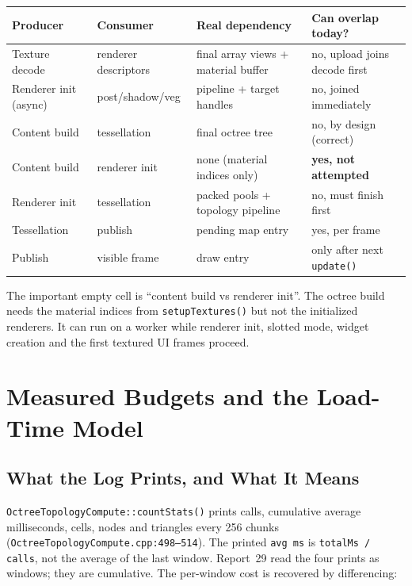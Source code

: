 \documentclass[11pt,a4paper]{article}
\begin{document}
\begin{table}[h]
\centering
\footnotesize
\begin{tabular}{@{}L{3.0cm}L{3.3cm}L{4.0cm}L{4.1cm}@{}}
\toprule
\textbf{Producer} & \textbf{Consumer} & \textbf{Real dependency} & \textbf{Can overlap today?} \\
\midrule
Texture decode & renderer descriptors & final array views + material buffer & no, upload joins decode first \\
Renderer init (async) & post/shadow/veg & pipeline + target handles & no, joined immediately \\
Content build & tessellation & final octree tree & no, by design (correct) \\
Content build & renderer init & none (material indices only) & \textbf{yes, not attempted} \\
Renderer init & tessellation & packed pools + topology pipeline & no, must finish first \\
Tessellation & publish & pending map entry & yes, per frame \\
Publish & visible frame & draw entry & only after next \texttt{update()} \\
\bottomrule
\end{tabular}
\end{table}

The important empty cell is ``content build vs renderer init''. The octree
build needs the material indices from \texttt{setupTextures()} but not the
initialized renderers. It can run on a worker while renderer init, slotted
mode, widget creation and the first textured UI frames proceed.

\section{Measured Budgets and the Load-Time Model}
\label{sec:budgets}

\subsection{What the Log Prints, and What It Means}

\texttt{OctreeTopologyCompute::countStats()} prints
calls, cumulative average milliseconds, cells, nodes and triangles every 256
chunks (\texttt{OctreeTopologyCompute.cpp:498--514}). The printed
\texttt{avg ms} is \texttt{totalMs / calls}, not the average of the last
window. Report~29 read the four prints as windows; they are cumulative. The
per-window cost is recovered by differencing:
\end{document}
